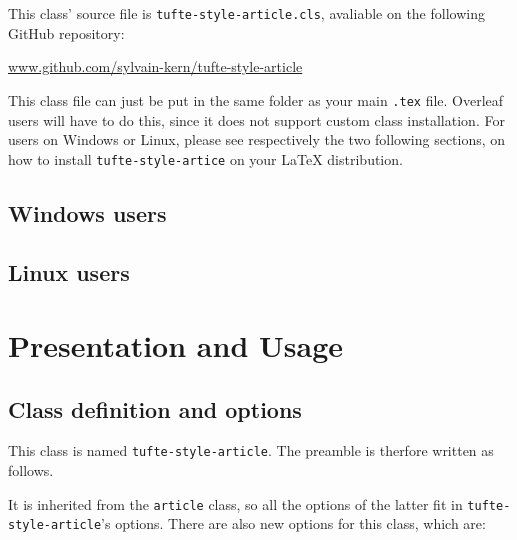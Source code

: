 \documentclass[raggedright, twoside, 11pt]{tufte-style-article}
\begin{document}
This class' source file is \texttt{tufte-style-article.cls}, avaliable on the following GitHub repository:

\url{www.github.com/sylvain-kern/tufte-style-article}

This class file can just be put in the same folder as your main \texttt{.tex} file. Overleaf users will have to do this, since it does not support custom class installation. For users on Windows or Linux, please see respectively the two following sections, on how to install \texttt{tufte-style-artice} on your \LaTeX{} distribution.

\subsection{Windows users}

\subsection{Linux users}

\section{Presentation and Usage}

\subsection{Class definition and options}

This class is named \texttt{tufte-style-article}. The preamble is therfore written as follows.

It is inherited from the \texttt{article} class, so all the options of the latter fit in \texttt{tufte-style-article}'s options. There are also new options for this class, which are:
\end{document}
